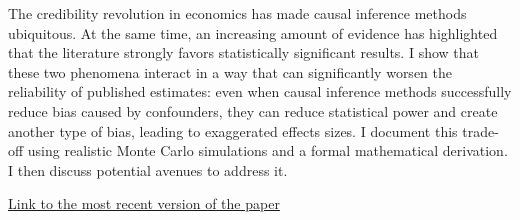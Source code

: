 \documentclass[usletter, 12pt]{article}
\begin{document}
		The credibility revolution in economics has made causal inference methods ubiquitous. At the same time, an increasing amount of evidence has highlighted that the literature strongly favors statistically significant results. I show that these two phenomena interact in a way that can significantly worsen the reliability of published estimates: even when causal inference methods successfully reduce bias caused by confounders, they can reduce statistical power and create another type of bias, leading to exaggerated effects sizes. I document this trade-off using realistic Monte Carlo simulations and a formal mathematical derivation. I then discuss potential avenues to address it. 
		
		
		
	
	\begin{center}
		\href{https://github.com/vincentbagilet/causal_exaggeration/blob/main/outputs/current_version/causal_exaggeration_paper.pdf}{Link to the most recent version of the paper}
	\end{center}
	
	
	\newpage
	


	
\end{document}
